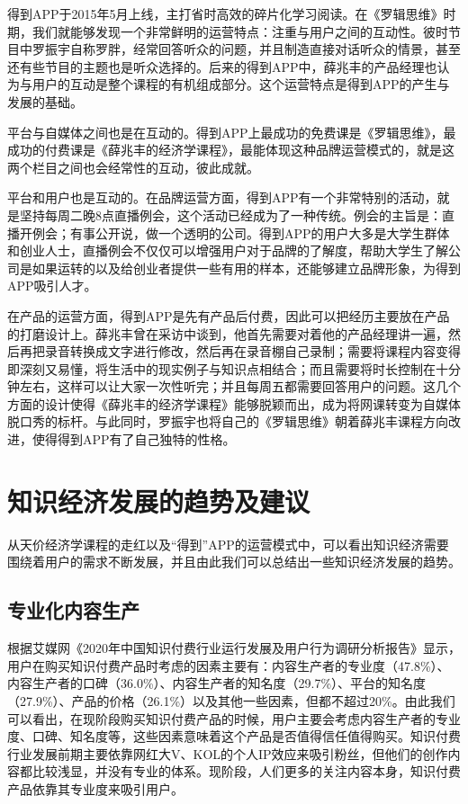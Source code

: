 \documentclass[UTF8,a4paper,12pt]{ctexart}  %
\begin{document}
得到APP于2015年5月上线，主打省时高效的碎片化学习阅读。在《罗辑思维》时期，我们就能够发现一个非常鲜明的运营特点：注重与用户之间的互动性。彼时节目中罗振宇自称罗胖，经常回答听众的问题，并且制造直接对话听众的情景，甚至还有些节目的主题也是听众选择的。后来的得到APP中，薛兆丰的产品经理也认为与用户的互动是整个课程的有机组成部分。这个运营特点是得到APP的产生与发展的基础。

平台与自媒体之间也是在互动的。得到APP上最成功的免费课是《罗辑思维》，最成功的付费课是《薛兆丰的经济学课程》，最能体现这种品牌运营模式的，就是这两个栏目之间也会经常性的互动，彼此成就。

平台和用户也是互动的。在品牌运营方面，得到APP有一个非常特别的活动，就是坚持每周二晚8点直播例会，这个活动已经成为了一种传统。例会的主旨是：直播开例会；有事公开说，做一个透明的公司。得到APP的用户大多是大学生群体和创业人士，直播例会不仅仅可以增强用户对于品牌的了解度，帮助大学生了解公司是如果运转的以及给创业者提供一些有用的样本，还能够建立品牌形象，为得到APP吸引人才。

在产品的运营方面，得到APP是先有产品后付费，因此可以把经历主要放在产品的打磨设计上。薛兆丰曾在采访中谈到，他首先需要对着他的产品经理讲一遍，然后再把录音转换成文字进行修改，然后再在录音棚自己录制；需要将课程内容变得即深刻又易懂，将生活中的现实例子与知识点相结合；而且需要将时长控制在十分钟左右，这样可以让大家一次性听完；并且每周五都需要回答用户的问题。这几个方面的设计使得《薛兆丰的经济学课程》能够脱颖而出，成为将网课转变为自媒体脱口秀的标杆。与此同时，罗振宇也将自己的《罗辑思维》朝着薛兆丰课程方向改进，使得得到APP有了自己独特的性格。

\hypertarget{section-16}{%
\section{知识经济发展的趋势及建议}\label{section-16}}

从天价经济学课程的走红以及``得到''APP的运营模式中，可以看出知识经济需要围绕着用户的需求不断发展，并且由此我们可以总结出一些知识经济发展的趋势。

\hypertarget{section-17}{%
\subsection{专业化内容生产}\label{section-17}}

根据艾媒网《2020年中国知识付费行业运行发展及用户行为调研分析报告》显示，用户在购买知识付费产品时考虑的因素主要有：内容生产者的专业度（47.8\%）、内容生产者的口碑（36.0\%）、内容生产者的知名度（29.7\%）、平台的知名度（27.9\%）、产品的价格（26.1\%）以及其他一些因素，但都不超过20\%。由此我们可以看出，在现阶段购买知识付费产品的时候，用户主要会考虑内容生产者的专业度、口碑、知名度等，这些因素意味着这个产品是否值得信任值得购买。知识付费行业发展前期主要依靠网红大V、KOL的个人IP效应来吸引粉丝，但他们的创作内容都比较浅显，并没有专业的体系。现阶段，人们更多的关注内容本身，知识付费产品依靠其专业度来吸引用户。
\end{document}
